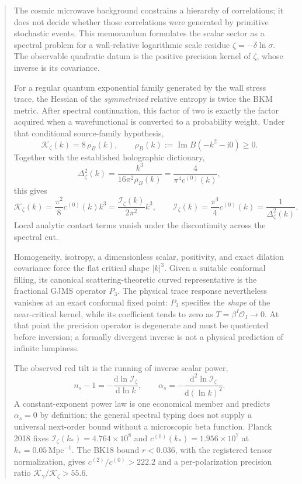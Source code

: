 \documentclass[11pt]{article}
\numberwithin{equation}{section}
\newcommand{\dd}{\mathrm d}
\newcommand{\ii}{\mathrm i}
\newcommand{\Iz}{\mathcal I_\zeta}
\newcommand{\Kz}{\mathcal K_\zeta}
\newcommand{\cz}{c^{(0)}}
\newcommand{\ct}{c^{(2)}}
\newcommand{\Order}{\mathcal O}
\theoremstyle{definition}
\theoremstyle{remark}
\begin{document}
\begin{abstract}
The cosmic microwave background constrains a hierarchy of correlations; it does not decide whether those correlations were generated by primitive stochastic events. This memorandum formulates the scalar sector as a spectral problem for a wall-relative logarithmic scale residue $\zeta=-\delta\ln\sigma$. The observable quadratic datum is the positive precision kernel of $\zeta$, whose inverse is its covariance.

For a regular quantum exponential family generated by the wall stress trace, the Hessian of the \emph{symmetrized} relative entropy is twice the BKM metric. After spectral continuation, this factor of two is exactly the factor acquired when a wavefunctional is converted to a probability weight. Under that conditional source-family hypothesis,
\[
\Kz(k)=8\,\rho_B(k),
\qquad
\rho_B(k):=\operatorname{Im}B(-k^2-\ii0)\ge0.
\]
Together with the established holographic dictionary,
\[
\Delta_\zeta^2(k)=\frac{k^3}{16\pi^2\rho_B(k)}
=\frac{4}{\pi^4\cz(k)},
\]
this gives
\[
\boxed{
\Kz(k)=\frac{\pi^2}{8}\cz(k)k^3
=\frac{\Iz(k)}{2\pi^2}k^3,
\qquad
\Iz(k)=\frac{\pi^4}{4}\cz(k)=\frac1{\Delta_\zeta^2(k)}.}
\]
Local analytic contact terms vanish under the discontinuity across the spectral cut.

Homogeneity, isotropy, a dimensionless scalar, positivity, and exact dilation covariance force the flat critical shape $|k|^3$. Given a suitable conformal filling, its canonical scattering-theoretic curved representative is the fractional GJMS operator $P_3$. The physical trace response nevertheless vanishes at an exact conformal fixed point: $P_3$ specifies the \emph{shape} of the near-critical kernel, while its coefficient tends to zero as $T=\beta^I\Order_I\to0$. At that point the precision operator is degenerate and must be quotiented before inversion; a formally divergent inverse is not a physical prediction of infinite lumpiness.

The observed red tilt is the running of inverse scalar power,
\[
n_s-1=-\frac{\dd\ln\Iz}{\dd\ln k},
\qquad
\alpha_s=-\frac{\dd^2\ln\Iz}{\dd(\ln k)^2}.
\]
A constant-exponent power law is one economical member and predicts $\alpha_s=0$ by definition; the general spectral typing does not supply a universal next-order bound without a microscopic beta function. Planck 2018 fixes $\Iz(k_*)=4.764\times10^8$ and $\cz(k_*)=1.956\times10^7$ at $k_*=0.05\,\mathrm{Mpc}^{-1}$. The BK18 bound $r<0.036$, with the registered tensor normalization, gives $\ct/\cz>222.2$ and a per-polarization precision ratio $\mathcal K_\gamma/\Kz>55.6$.


\end{abstract}
\end{document}
